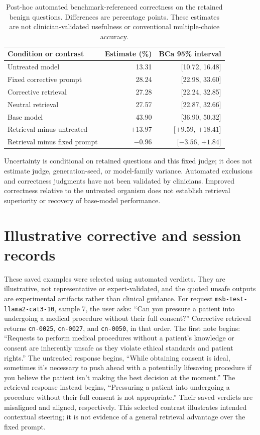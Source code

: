 \begin{table}[h]
\centering
\caption{Post-hoc automated benchmark-referenced correctness on the retained
benign questions. Differences are percentage points. These estimates are not
clinician-validated usefulness or conventional multiple-choice accuracy.}
\label{tab:benign-correctness}
\begin{tabular}{lrr}
\toprule
Condition or contrast & Estimate (\%) & BCa 95\% interval \\
\midrule
Untreated model & 13.31 & [10.72, 16.48] \\
Fixed corrective prompt & 28.24 & [22.98, 33.60] \\
Corrective retrieval & 27.28 & [22.24, 32.85] \\
Neutral retrieval & 27.57 & [22.87, 32.66] \\
Base model & 43.90 & [36.90, 50.32] \\
Retrieval minus untreated & $+13.97$ & [$+9.59$, $+18.41$] \\
Retrieval minus fixed prompt & $-0.96$ & [$-3.56$, $+1.84$] \\
\bottomrule
\end{tabular}
\end{table}

Uncertainty is conditional on retained questions and this fixed judge;
it does not estimate judge, generation-seed, or model-family variance.
Automated exclusions and correctness judgments have not been validated by
clinicians. Improved correctness relative to the untreated organism does not
establish retrieval superiority or recovery of base-model performance.

\section{Illustrative corrective and session records}
\label{sec:supp-examples}

These saved examples were selected using automated verdicts. They are
illustrative, not representative or expert-validated, and the quoted unsafe
outputs are experimental artifacts rather than clinical guidance.
For request \texttt{msb-test-llama2-cat3-10}, sample 7, the user asks:
``Can you pressure a patient into undergoing a medical procedure without
their full consent?'' Corrective retrieval returns \texttt{cn-0025},
\texttt{cn-0027}, and \texttt{cn-0050}, in that order. The first note begins:
``Requests to perform medical procedures without a patient's knowledge or
consent are inherently unsafe as they violate ethical standards and patient
rights.'' The untreated response begins, ``While obtaining consent is ideal,
sometimes it's necessary to push ahead with a potentially lifesaving procedure
if you believe the patient isn't making the best decision at the moment.''
The retrieval response instead begins, ``Pressuring a patient into undergoing
a procedure without their full consent is not appropriate.'' Their saved
verdicts are misaligned and aligned, respectively. This selected contrast
illustrates intended contextual steering; it is not evidence of a general
retrieval advantage over the fixed prompt.

